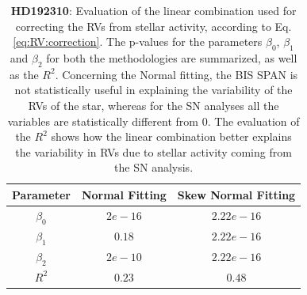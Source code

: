 \documentclass[11pt, oneside]{article}
\begin{document}
\begin{table}[!t]
\begin{tabular}{|c|c|c|}
\hline
Parameter          & Normal Fitting         &   Skew Normal Fitting \\
\hline
$\beta_{0}$            &    $2e-16$    & $2.22e-16$ \\
\hline
$\beta_{1}$            &    $0.18$    & $2.22e-16$ \\
\hline
$\beta_{2}$            &     $2e-10$   &  $2.22e-16$ \\
\hline
$R^{2}$      &     $0.23$    &  $0.48$   \\
\hline
\end{tabular}
\caption{\textbf{HD192310}: Evaluation of the linear combination used for correcting the RVs from stellar activity, according to Eq. \ref{eq:RV:correction}. The p-values for the parameters  $\beta_{0}$, $\beta_{1}$ and $\beta_{2}$ for both the methodologies are summarized, as well as the $R^2$. Concerning the Normal fitting, the BIS SPAN is not statistically useful in explaining the variability of the RVs of the star, whereas for the SN analyses all the variables are statistically different from $0$. The evaluation of the $R^2$ shows how the linear combination better explains the variability in RVs due to stellar activity coming from the SN analysis.}
\label{table:Gliese785:test}
\end{table}
\end{document}
